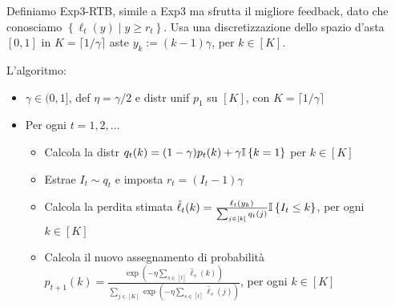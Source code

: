 Definiamo Exp3-RTB, simile a Exp3 ma sfrutta il migliore feedback, dato che conosciamo $\left\{\ell_t (y) \mid y \geq r_t \right\}$. Usa una discretizzazione dello spazio d'asta $[0,1]$ in $K = \lceil 1/\gamma \rceil$ aste $y_k := (k-1)\gamma$, per $k \in [K]$.

L'algoritmo:
\begin{itemize}
    \item $\gamma \in (0,1]$, def $\eta = \gamma/2$ e distr unif $p_1$ su $[K]$, con $K = \lceil 1/\gamma \rceil$

    \item Per ogni $t = 1, 2, \dots$
    \begin{itemize}
        \item Calcola la distr $q_t(k) = (1- \gamma)p_t(k) + \gamma \mathbb{I}\left\{k=1\right\}$ per $k \in [K]$

        \item Estrae $I_t \sim q_t$ e imposta $r_t = (I_t - 1)\gamma$

        \item Calcola la perdita stimata $\hat \ell_t (k) = \frac{\ell_t (y_k)}{\sum_{j \in [k]} q_t(j)} \mathbb{I}\left\{I_t \leq k\right\}$, per ogni $k \in [K]$

        \item Calcola il nuovo assegnamento di probabilità $p_{t+1} (k) = \frac{\exp \left(-\eta \sum_{s \in [t]} \hat \ell_s (k)\right)}{\sum_{j \in [K]} \exp \left(- \eta \sum_{s \in [t]} \hat \ell_s (j)\right)}$, per ogni $k \in [K]$
    \end{itemize}
\end{itemize}

